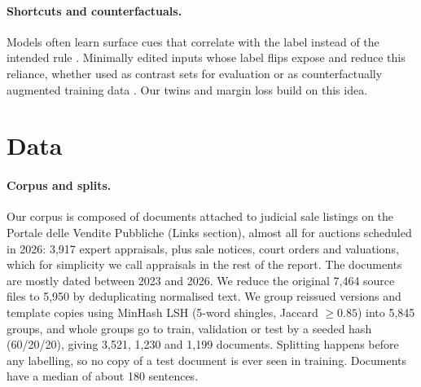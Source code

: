 \documentclass[11pt]{article}
\begin{document}
\paragraph{Shortcuts and counterfactuals.} Models often learn surface cues that correlate with the label instead of the intended rule \citep{geirhos2020shortcut,mccoy2019right}. Minimally edited inputs whose label flips expose and reduce this reliance, whether used as contrast sets for evaluation \citep{gardner2020contrast} or as counterfactually augmented training data \citep{kaushik2020learning}. Our twins and margin loss build on this idea.


\section{Data}
\label{sec:data}

\paragraph{Corpus and splits.} Our corpus is composed of documents attached to judicial sale listings on the Portale delle Vendite Pubbliche (Links section), almost all for auctions scheduled in 2026: 3,917 expert appraisals, plus sale notices, court orders and valuations, which for simplicity we call appraisals in the rest of the report. The documents are mostly dated between 2023 and 2026. We reduce the original 7,464 source files to 5,950 by deduplicating normalised text. We group reissued versions and template copies using MinHash LSH \citep{broder1997resemblance} (5-word shingles, Jaccard $\geq 0.85$) into 5,845 groups, and whole groups go to train, validation or test by a seeded hash (60/20/20), giving 3,521, 1,230 and 1,199 documents. Splitting happens before any labelling, so no copy of a test document is ever seen in training. Documents have a median of about 180 sentences.
\end{document}
